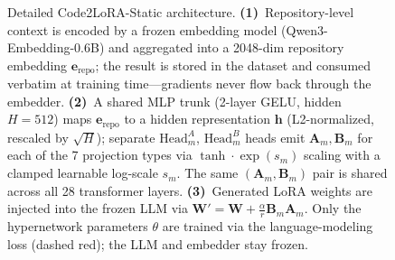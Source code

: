 \documentclass{llmxive}
\providecommand{\codelora}{Code2LoRA\xspace}
\providecommand{\codelorastatic}{\codelora-Static\xspace}
\begin{document}
\begin{figure}[t]
\begin{center}
{%
}%


\caption{Detailed \codelorastatic{} architecture.
\textbf{(1)}~Repository-level context is encoded by a frozen embedding model (Qwen3-Embedding-0.6B) and aggregated into a 2048-dim repository embedding $\mathbf{e}_{\text{repo}}$; the result is stored in the dataset and consumed verbatim at training time---gradients never flow back through the embedder.
\textbf{(2)}~A shared MLP trunk (2-layer GELU, hidden $H{=}512$) maps $\mathbf{e}_{\text{repo}}$ to a hidden representation $\mathbf{h}$ (L2-normalized, rescaled by $\sqrt{H}$); separate $\text{Head}^A_m$, $\text{Head}^B_m$ heads emit $\mathbf{A}_m, \mathbf{B}_m$ for each of the 7 projection types via $\tanh\cdot\exp(s_m)$ scaling with a clamped learnable log-scale $s_m$. The same $(\mathbf{A}_m, \mathbf{B}_m)$ pair is shared across all 28 transformer layers.
\textbf{(3)}~Generated LoRA weights are injected into the frozen LLM via $\mathbf{W}' = \mathbf{W} + \tfrac{\alpha}{r}\mathbf{B}_m\mathbf{A}_m$.
Only the hypernetwork parameters $\theta$ are trained via the language-modeling loss (dashed red); the LLM and embedder stay frozen.}
\label{fig:architecture_static}
\end{center}
\end{figure}
\end{document}
